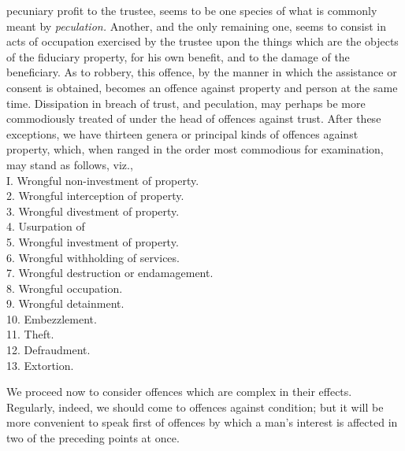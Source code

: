 \documentclass[12pt]{report}
\begin{document}
pecuniary profit to the trustee, seems to be one species of what is
commonly meant by \emph{peculation.} Another, and the only remaining
one, seems to consist in acts of occupation exercised by the trustee
upon the things which are the objects of the fiduciary property, for his
own benefit, and to the damage of the beneficiary. As to robbery, this
offence, by the manner in which the assistance or consent is obtained,
becomes an offence against property and person at the same time.
Dissipation in breach of trust, and peculation, may perhaps be more
commodiously treated of under the head of offences against trust. After
these exceptions, we have thirteen genera or principal kinds of offences
against property, which, when ranged in the order most commodious for
examination, may stand as follows, viz.,\\
I. Wrongful non-investment of property.\\
2. Wrongful interception of property.\\
3. Wrongful divestment of property.\\
4. Usurpation of\\
5. Wrongful investment of property.\\
6. Wrongful withholding of services.\\
7. Wrongful destruction or endamagement.\\
8. Wrongful occupation.\\
9. Wrongful detainment.\\
10. Embezzlement.\\
11. Theft.\\
12. Defraudment.\\
13. Extortion.

We proceed now to consider offences which are complex in their effects.
Regularly, indeed, we should come to offences against condition; but it
will be more convenient to speak first of offences by which a man's
interest is affected in two of the preceding points at once.
\end{document}
